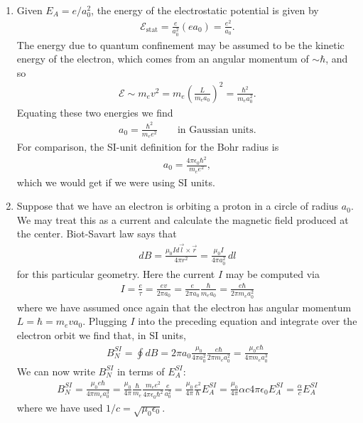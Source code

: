 \documentclass{book}
\theoremstyle{definition}
\newcommand{\al}{\alpha}
\newcommand{\f}[2]{\frac{#1}{#2}}
\newcommand{\lp}{\left(}
\newcommand{\rp}{\right)}
\begin{document}
\begin{enumerate}[label=\alph*)]
	\item Given $E_A = e/a_0^2$, the energy of the electrostatic potential is given by 
	\begin{align*}
		\mathcal{E}_\text{stat} = \f{e}{a_0^2}  (e a_0) = \f{e^2}{a_0}.
	\end{align*}
	The energy due to quantum confinement may be assumed to be the kinetic energy of the electron, which comes from an angular momentum of $\sim \hbar$, and so 
	\begin{align*}
		\mathcal{E} \sim m_ev^2 = m_e \lp \f{L}{m_ea_0}\rp^2 = \f{\hbar^2}{m_e a_0^2}.
	\end{align*}
	Equating these two energies we find 
	\begin{align*}
		a_0 = \f{\hbar^2}{m_e e^2} \quad\quad \text{in Gaussian units.}
	\end{align*}
	For comparison, the SI-unit definition for the Bohr radius is 
	\begin{align*}
		a_0 = \f{4\pi \epsilon_0\hbar^2}{ m_e  e^2},
	\end{align*} 
	which we would get if we were using SI units. 
	
	\item Suppose that we have an electron is orbiting a proton in a circle of radius $a_0$. We may treat this as a current and calculate the magnetic field produced at the center. Biot-Savart law says that
	\begin{align*}
		dB = \f{\mu_0 I d\vec{l}\times \vec{r}}{4\pi r^2} = \f{\mu_0 I }{4\pi a_0^2}\,dl
	\end{align*}
	for this particular geometry. Here the current $I$ may be computed via
	\begin{align*}
		I = \f{e}{\tau} = \f{e v}{2\pi a_0} = \f{e}{2\pi a_0} \f{\hbar}{m_ea_0} = \f{e \hbar }{2\pi m_ea_0^2}
	\end{align*}
	where we have assumed once again that the electron has angular momentum $L = \hbar =  m_eva_0$. Plugging $I$ into the preceding equation and integrate over the electron orbit we find that, in SI units,
	\begin{align*}
		B_N^{SI} = \oint dB = 2\pi a_0 \f{\mu_0 }{4\pi a_0^2}\f{e \hbar }{2\pi m_e a_0^2} = {\f{\mu_0 e \hbar}{4\pi m_e a_0^3}}
	\end{align*}
	We can now write $B_N^{SI}$ in terms of $E_A^{SI}$:
	\begin{align*}
		B_N^{SI} = \f{\mu_0 e \hbar}{4\pi m_e a_0^3} = \f{\mu_0}{4\pi} \f{\hbar}{m_e} \f{m_e e^2}{4\pi \epsilon_0 \hbar^2}  \f{e}{ a_0^2}  = \f{\mu_0}{4\pi} \f{e^2}{\hbar} E_A^{SI} = \f{\mu_0}{4\pi} \al c 4\pi \epsilon_0 E_A^{SI} = \boxed{\f{\al}{c}E_A^{SI}}
	\end{align*}
	where we have used $1/c = \sqrt{\mu_0 \epsilon_0}$.
	

\end{enumerate}
\end{document}
